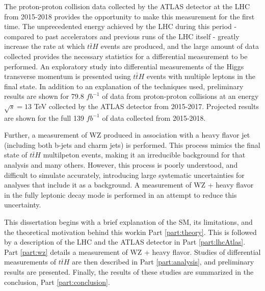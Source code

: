 The proton-proton collision data collected by the ATLAS detector at the LHC from 2015-2018 provides the opportunity to make this measurement for the first time. The unprecedented energy achieved by the LHC during this period - compared to past accelerators and previous runs of the LHC itself - greatly increase the rate at which $t\bar{t}H$ events are produced, and the large amount of data collected provides the necessary statistics for a differential measurement to be performed. An exploratory study into differential measurements of the Higgs transverse momentum is presented using $t\bar{t}H$ events with multiple leptons in the final state. In addition to an explanation of the techniques used, preliminary results are shown for 79.8 $fb^{-1}$ of data from proton-proton collisions at an energy $\sqrt{s} = 13$ TeV collected by the ATLAS detector from 2015-2017. Projected results are shown for the full 139 $fb^{-1}$ of data collected from 2015-2018. 

Further, a measurement of WZ produced in association with a heavy flavor jet (including both b-jets and charm jets) is performed. This process mimics the final state of $t\bar{t}H$ multilpeton events, making it an irreducible background for that analysis and many others. However, this process is poorly understood, and difficult to simulate accurately, introducing large systematic uncertainties for analyses that include it as a background. A measurement of WZ + heavy flavor in the fully leptonic decay mode is performed in an attempt to reduce this uncertainty.

This dissertation begins with a brief explanation of the SM, its limitations, and the theoretical motivation behind this workin Part \ref{part:theory}. This is followed by a description of the LHC and the ATLAS detector in Part \ref{part:lhcAtlas}. Part \ref{part:wz} details a measurement of WZ + heavy flavor. Studies of differential measurements of $t\bar{t}H$ are then described in Part \ref{part:analysis}, and preliminary results are presented. Finally, the results of these studies are summarized in the conclusion, Part \ref{part:conclusion}.

